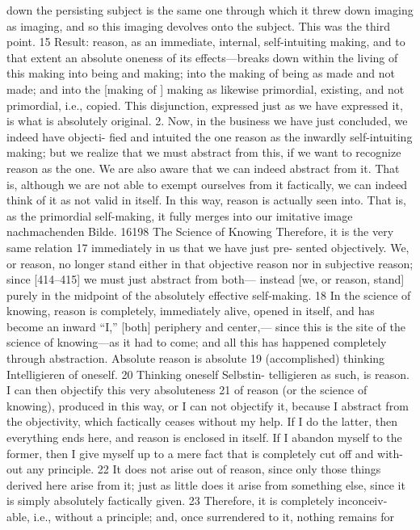 down the persisting subject is the same one through which it threw down
imaging as imaging, and so this imaging devolves onto the subject. This was
the third point. 15
Result: reason, as an immediate, internal, self-intuiting making, and to
that extent an absolute oneness of its effects—breaks down within the living
of this making into being and making; into the making of being as made and
not made; and into the [making of ] making as likewise primordial, existing,
and not primordial, i.e., copied. This disjunction, expressed just as we have
expressed it, is what is absolutely original.
2. Now, in the business we have just concluded, we indeed have objecti-
fied and intuited the one reason as the inwardly self-intuiting making; but we
realize that we must abstract from this, if we want to recognize reason as the one.
We are also aware that we can indeed abstract from it. That is, although we are
not able to exempt ourselves from it factically, we can indeed think of it as not
valid in itself. In this way, reason is actually seen into. That is, as the primordial
self-making, it fully merges into our imitative image {nachmachenden Bilde}. 16198
The Science of Knowing
Therefore, it is the very same relation 17 immediately in us that we have just pre-
sented objectively. We, or reason, no longer stand either in that objective reason
nor in subjective reason; since [414–415] we must just abstract from both—
instead [we, or reason, stand] purely in the midpoint of the absolutely effective
self-making. 18 In the science of knowing, reason is completely, immediately alive,
opened in itself, and has become an inward “I,” [both] periphery and center,—
since this is the site of the science of knowing—as it had to come; and all this
has happened completely through abstraction. Absolute reason is absolute 19
(accomplished) thinking {Intelligieren} of oneself. 20 Thinking oneself {Selbstin-
telligieren} as such, is reason.
I can then objectify this very absoluteness 21 of reason (or the science of
knowing), produced in this way, or I can not objectify it, because I abstract from
the objectivity, which factically ceases without my help. If I do the latter, then
everything ends here, and reason is enclosed in itself. If I abandon myself to the
former, then I give myself up to a mere fact that is completely cut off and with-
out any principle. 22 It does not arise out of reason, since only those things
derived here arise from it; just as little does it arise from something else, since
it is simply absolutely factically given. 23 Therefore, it is completely inconceiv-
able, i.e., without a principle; and, once surrendered to it, nothing remains for

